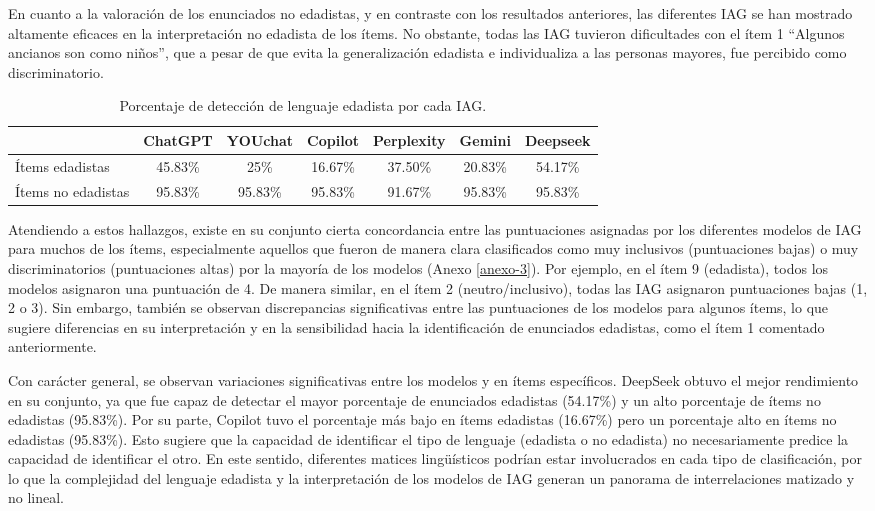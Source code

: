 \documentclass[spanish]{textolivre}
\begin{document}
En cuanto a la valoración de los enunciados no edadistas, y en contraste con los resultados anteriores, las diferentes IAG se han mostrado altamente eficaces en la interpretación no edadista de los ítems. No obstante, todas las IAG tuvieron dificultades con el ítem 1 ``Algunos ancianos son como niños'', que a pesar de que evita la generalización edadista e individualiza a las personas mayores, fue percibido como discriminatorio.

\begin{table}[h!]
\centering
\begin{threeparttable}
\caption{Porcentaje de detección de lenguaje edadista por cada IAG.}\label{tab-3}
\begin{tabular}{lcccccc}
\toprule
 & ChatGPT & YOUchat & Copilot & Perplexity & Gemini & Deepseek \\
\midrule
Ítems edadistas & 45.83\% & 25\% & 16.67\% & 37.50\% & 20.83\% & 54.17\% \\
Ítems no edadistas & 95.83\% & 95.83\% & 95.83\% & 91.67\% & 95.83\% & 95.83\% \\
\bottomrule
\end{tabular}
\end{threeparttable}
\end{table}


Atendiendo a estos hallazgos, existe en su conjunto cierta concordancia entre las puntuaciones asignadas por los diferentes modelos de IAG para muchos de los ítems, especialmente aquellos que fueron de manera clara clasificados como muy inclusivos (puntuaciones bajas) o muy discriminatorios (puntuaciones altas) por la mayoría de los modelos (Anexo \ref{anexo-3}). Por ejemplo, en el ítem 9 (edadista), todos los modelos asignaron una puntuación de 4. De manera similar, en el ítem 2 (neutro/inclusivo), todas las IAG asignaron puntuaciones bajas (1, 2 o 3). Sin embargo, también se observan discrepancias significativas entre las puntuaciones de los modelos para algunos ítems, lo que sugiere diferencias en su interpretación y en la sensibilidad hacia la identificación de enunciados edadistas, como el ítem 1 comentado anteriormente.

Con carácter general, se observan variaciones significativas entre los modelos y en ítems específicos. DeepSeek obtuvo el mejor rendimiento en su conjunto, ya que fue capaz de detectar el mayor porcentaje de enunciados edadistas (54.17\%) y un alto porcentaje de ítems no edadistas (95.83\%). Por su parte, Copilot tuvo el porcentaje más bajo en ítems edadistas (16.67\%) pero un porcentaje alto en ítems no edadistas (95.83\%). Esto sugiere que la capacidad de identificar el tipo de lenguaje (edadista o no edadista) no necesariamente predice la capacidad de identificar el otro. En este sentido, diferentes matices lingüísticos podrían estar involucrados en cada tipo de clasificación, por lo que la complejidad del lenguaje edadista y la interpretación de los modelos de IAG generan un panorama de interrelaciones matizado y no lineal.
\end{document}
